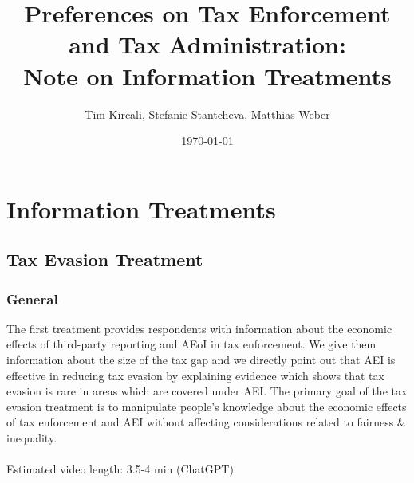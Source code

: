 \documentclass[11pt]{article}
\title{Preferences on Tax Enforcement and Tax Administration:\\Note on Information Treatments}
\author{Tim Kircali, Stefanie Stantcheva, Matthias Weber}
\date{\today} %
\begin{document}
\maketitle
\section{Information Treatments}
\subsection{Tax Evasion Treatment}
\subsubsection*{General}
The first treatment provides respondents with information about the economic effects of third-party reporting and AEoI in tax enforcement. We give them information about the size of the tax gap and we directly point out that AEI is effective in reducing tax evasion by explaining evidence which shows that tax evasion is rare in areas which are covered under AEI. The primary goal of the tax evasion treatment is to manipulate people’s knowledge about the economic effects of tax enforcement and AEI without affecting considerations related to fairness \& inequality. \\ \\  
Estimated video length: 3.5-4 min (ChatGPT)
\end{document}
